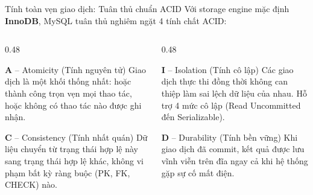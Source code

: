 \documentclass[aspectratio=169,11pt]{beamer}
\newcommand{\kw}[1]{\textcolor{dbblue}{\textbf{#1}}}
\newcommand{\smallgap}{\vspace{0.25em}}
\begin{document}
\begin{frame}{Tính toàn vẹn giao dịch: Tuân thủ chuẩn ACID}
Với storage engine mặc định \kw{InnoDB}, MySQL tuân thủ nghiêm ngặt 4 tính chất ACID:

\smallgap
\begin{columns}[t]
  \begin{column}{0.48\textwidth}
    \begin{block}{\textbf{A} -- Atomicity (Tính nguyên tử)}
      \small
      Giao dịch là một khối thống nhất: hoặc thành công trọn vẹn mọi thao tác, hoặc không có thao tác nào được ghi nhận.
    \end{block}
    \begin{block}{\textbf{C} -- Consistency (Tính nhất quán)}
      \small
      Dữ liệu chuyển từ trạng thái hợp lệ này sang trạng thái hợp lệ khác, không vi phạm bất kỳ ràng buộc (PK, FK, CHECK) nào.
    \end{block}
  \end{column}
  \begin{column}{0.48\textwidth}
    \begin{block}{\textbf{I} -- Isolation (Tính cô lập)}
      \small
      Các giao dịch thực thi đồng thời không can thiệp làm sai lệch dữ liệu của nhau. Hỗ trợ 4 mức cô lập (Read Uncommitted đến Serializable).
    \end{block}
    \begin{block}{\textbf{D} -- Durability (Tính bền vững)}
      \small
      Khi giao dịch đã commit, kết quả được lưu vĩnh viễn trên đĩa ngay cả khi hệ thống gặp sự cố mất điện.
    \end{block}
  \end{column}
\end{columns}
\end{frame}

\end{document}
